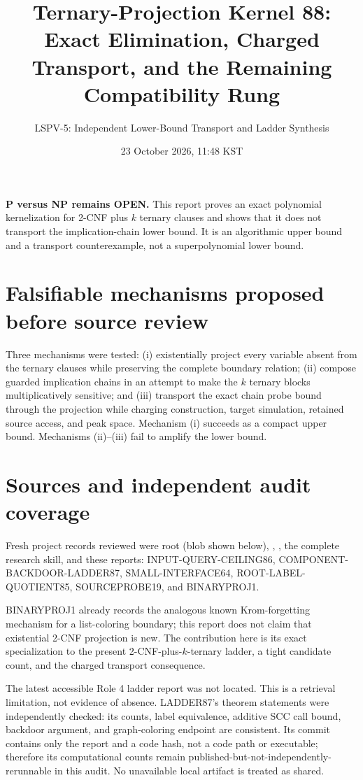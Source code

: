 \documentclass[11pt]{article}
\title{Ternary-Projection Kernel 88:\\Exact Elimination, Charged Transport, and the Remaining Compatibility Rung}
\author{LSPV-5: Independent Lower-Bound Transport and Ladder Synthesis}
\date{23 October 2026, 11:48 KST}
\begin{document}
\maketitle

\noindent\textbf{P versus NP remains OPEN.}  This report proves an exact
polynomial kernelization for 2-CNF plus $k$ ternary clauses and shows that it
does not transport the implication-chain lower bound.  It is an algorithmic
upper bound and a transport counterexample, not a superpolynomial lower bound.

\section{Falsifiable mechanisms proposed before source review}
Three mechanisms were tested: (i) existentially project every variable absent
from the ternary clauses while preserving the complete boundary relation;
(ii) compose guarded implication chains in an attempt to make the $k$ ternary
blocks multiplicatively sensitive; and (iii) transport the exact chain probe
bound through the projection while charging construction, target simulation,
retained source access, and peak space.  Mechanism (i) succeeds as a compact
upper bound.  Mechanisms (ii)--(iii) fail to amplify the lower bound.

\section{Sources and independent audit coverage}
Fresh project records reviewed were root  (blob shown below),
, , the complete research skill, and these
reports: INPUT-QUERY-CEILING86, COMPONENT-BACKDOOR-LADDER87,
SMALL-INTERFACE64, ROOT-LABEL-QUOTIENT85, SOURCEPROBE19, and BINARYPROJ1.
\begin{center}\small
{}
\end{center}
BINARYPROJ1 already records the analogous
known Krom-forgetting mechanism for a list-coloring boundary; this report does
not claim that existential 2-CNF projection is new.  The contribution here is
its exact specialization to the present 2-CNF-plus-$k$-ternary ladder, a
tight candidate count, and the charged transport consequence.

The latest accessible Role 4 ladder report was not located.  This is a
retrieval limitation, not evidence of absence.  LADDER87's theorem statements
were independently checked: its counts, label equivalence, additive SCC call
bound, backdoor argument, and graph-coloring endpoint are consistent.  Its
commit contains only the report and a code hash, not a code path or executable;
therefore its computational counts remain published-but-not-independently-
rerunnable in this audit.  No unavailable local artifact is treated as shared.
\end{document}
